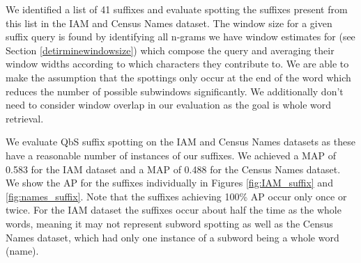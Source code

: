 \documentclass[ms,electronic,twosidetoc,letterpaper,chaptercenter,parttop,lof,lot]{byumsphd}
\begin{document}
We identified a list of 41 suffixes and evaluate spotting the suffixes present from this list in the IAM and Census Names dataset. 
 The window size for a given suffix query is found by identifying all n-grams we have window estimates for (see Section \ref{detirminewindowsize}) which compose the query and averaging their window widths according to which characters they contribute to.
We are able to make the assumption that the spottings only occur at the end of the word which reduces the number of possible subwindows significantly. We additionally don't need to consider window overlap in our evaluation as the goal is whole word retrieval.

We evaluate QbS suffix spotting on the IAM and Census Names datasets as these have a reasonable number of instances of our suffixes. We achieved a MAP of 0.583 for the IAM dataset and a MAP of 0.488 for the Census Names dataset. We show the AP for the suffixes individually in Figures \ref{fig:IAM_suffix} and \ref{fig:names_suffix}. Note that the suffixes achieving 100\% AP occur only once or twice. For the IAM dataset the suffixes occur about half the time as the whole words, meaning it may not represent subword spotting as well as the Census Names dataset, which had only one instance of a subword being a whole word (name).



\end{document}
